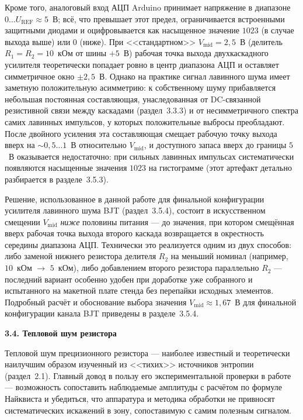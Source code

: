 Кроме того, аналоговый вход АЦП Arduino принимает напряжение в диапазоне $0\ldots
U_\mathrm{REF}\approx 5$~В; всё, что превышает этот предел, ограничивается
встроенными защитными диодами и оцифровывается как насыщенное значение $1023$
(в случае выхода выше) или $0$ (ниже). При <<стандартном>> $V_\mathrm{mid}=2{,}5$~В
(делитель $R_1{=}R_2{=}10$~кОм от шины $+5$~В) рабочая точка выхода
двухкаскадного усилителя теоретически попадает ровно в центр диапазона АЦП и
оставляет симметричное окно $\pm 2{,}5$~В. Однако на практике сигнал
лавинного шума имеет заметную положительную асимметрию: к собственному шуму
прибавляется небольшая постоянная составляющая, унаследованная от
DC-связанной резистивной связи между каскадами (раздел~3.3.3) и от
несимметричного спектра самих лавинных импульсов, у которых положительные
выбросы преобладают. После двойного усиления эта составляющая смещает рабочую
точку выхода вверх на $\sim 0{,}5\ldots 1$~В относительно $V_\mathrm{mid}$, и
доступного запаса вверх до границы $5$~В оказывается недостаточно: при сильных
лавинных импульсах систематически появляются насыщенные значения $1023$ на
гистограмме (этот артефакт детально разбирается в разделе~3.5.3).

Решение, использованное в данной работе для финальной конфигурации усилителя
лавинного шума BJT (раздел~3.5.4), состоит в искусственном смещении $V_\mathrm{mid}$
\emph{ниже} половины питания --- до значения, при котором смещённая вверх
рабочая точка выхода второго каскада возвращается в окрестность середины
диапазона АЦП. Технически это реализуется одним из двух способов: либо заменой
нижнего резистора делителя $R_2$ на меньший номинал (например, $10$~кОм $\to$
$5$~кОм), либо добавлением второго резистора параллельно $R_2$ --- последний
вариант особенно удобен при доработке уже собранного и испытанного на макетной
плате стенда без перепайки исходных элементов. Подробный расчёт и обоснование
выбора значения $V_\mathrm{mid}\approx 1{,}67$~В для финальной конфигурации
канала BJT приведены в разделе~3.5.4.

\textbf{3.4. Тепловой шум резистора}

Тепловой шум прецизионного резистора --- наиболее известный и теоретически наилучшим
образом изученный из <<тихих>> источников энтропии (раздел~2.1). Главный довод в пользу
его экспериментальной проверки в работе --- возможность сопоставить наблюдаемые
амплитуды с расчётом по формуле Найквиста и убедиться, что аппаратура и
методика обработки не привносят систематических искажений в зону, сопоставимую
с самим полезным сигналом.

